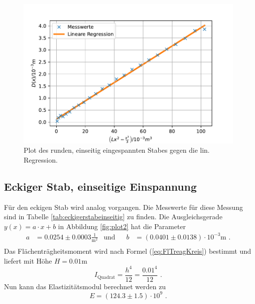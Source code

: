 \begin{figure}[H]
  \centering
  \includegraphics{pictures/Lineare Regression1.pdf}
  \caption{Plot des runden, einseitig eingespannten Stabes gegen die lin. Regression.}
  \label{fig:plot1}
\end{figure}

\subsection{Eckiger Stab, einseitige Einspannung}

Für den eckigen Stab wird analog vorgangen.
Die Messwerte für diese Messung sind in Tabelle \ref{tab:eckigerstabeinseitig} zu finden.
Die Ausgleichsgerade $y(x) = a \cdot x + b$ in Abbildung \ref{fig:plot2} hat die Parameter
\begin{align*}
  a &= 0.0254 ± 0.0003 \frac{1}{\unit{\meter\squared}} & \text{und}& & b&= (0.0401 ± 0.0138) \cdot 10^{-3} \unit\meter \text{ .} \\
\end{align*}
Das Flächenträgheitsmoment wird nach Formel (\ref{eq:FlTreagKreis}) bestimmt und liefert mit Höhe $H = 0.01 \unit\meter$
\begin{equation*}
  I_\text{Quadrat} = \frac{h^4} {12} = \frac{0.01^4} {12} \text{ .}
\end{equation*}
Nun kann das Elastizitätsmodul berechnet werden zu
\begin{equation*}
  E = (124.3 \pm 1.5) \cdot 10^{9} \text{ .}
\end{equation*}


